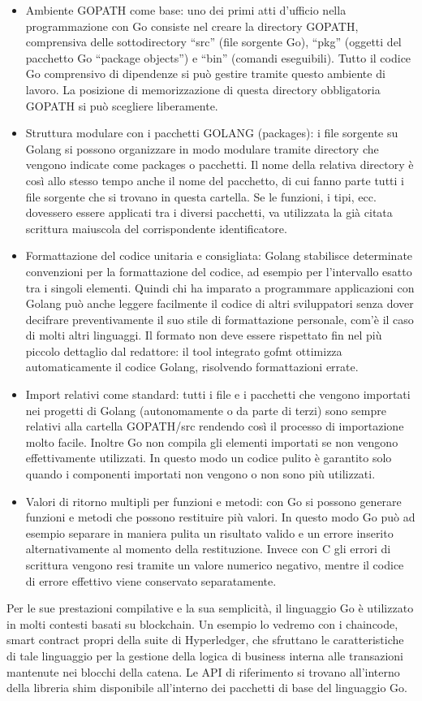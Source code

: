 \begin{itemize}
    \item Ambiente GOPATH come base: uno dei primi atti d’ufficio nella programmazione con Go consiste nel creare la directory GOPATH, comprensiva delle sottodirectory “src” (file sorgente Go), “pkg” (oggetti del pacchetto Go “package objects”) e “bin” (comandi eseguibili). Tutto il codice Go comprensivo di dipendenze si può gestire tramite questo ambiente di lavoro. La posizione di memorizzazione di questa directory obbligatoria GOPATH si può scegliere liberamente.
    \item Struttura modulare con i pacchetti GOLANG (packages): i file sorgente su Golang si possono organizzare in modo modulare tramite directory che vengono indicate come packages o pacchetti. Il nome della relativa directory è così allo stesso tempo anche il nome del pacchetto, di cui fanno parte tutti i file sorgente che si trovano in questa cartella. Se le funzioni, i tipi, ecc. dovessero essere applicati tra i diversi pacchetti, va utilizzata la già citata scrittura maiuscola del corrispondente identificatore.
    \item Formattazione del codice unitaria e consigliata: Golang stabilisce determinate convenzioni per la formattazione del codice, ad esempio per l’intervallo esatto tra i singoli elementi. Quindi chi ha imparato a programmare applicazioni con Golang può anche leggere facilmente il codice di altri sviluppatori senza dover decifrare preventivamente il suo stile di formattazione personale, com’è il caso di molti altri linguaggi. Il formato non deve essere rispettato fin nel più piccolo dettaglio dal redattore: il tool integrato gofmt ottimizza automaticamente il codice Golang, risolvendo formattazioni errate.
    \item Import relativi come standard: tutti i file e i pacchetti che vengono importati nei progetti di Golang (autonomamente o da parte di terzi) sono sempre relativi alla cartella GOPATH/src rendendo così il processo di importazione molto facile. Inoltre Go non compila gli elementi importati se non vengono effettivamente utilizzati. In questo modo un codice pulito è garantito solo quando i componenti importati non vengono o non sono più utilizzati.
    \item Valori di ritorno multipli per funzioni e metodi: con Go si possono generare funzioni e metodi che possono restituire più valori. In questo modo Go può ad esempio separare in maniera pulita un risultato valido e un errore inserito alternativamente al momento della restituzione. Invece con C gli errori di scrittura vengono resi tramite un valore numerico negativo, mentre il codice di errore effettivo viene conservato separatamente.
\end{itemize}
Per le sue prestazioni compilative e la sua semplicità, il linguaggio Go è utilizzato in molti contesti basati su blockchain. Un esempio lo vedremo con i chaincode, smart contract propri della suite di Hyperledger, che sfruttano le caratteristiche di tale linguaggio per la gestione della logica di business interna alle transazioni mantenute nei blocchi della catena. Le API di riferimento si trovano all'interno della libreria shim disponibile all'interno dei pacchetti di base del linguaggio Go. 
